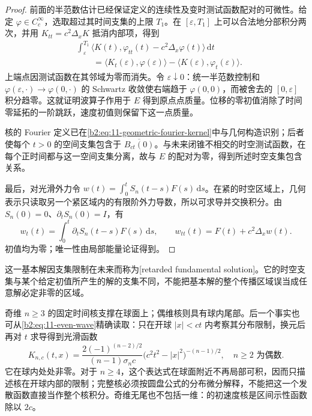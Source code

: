 \begin{proof}
前面的半范数估计已经保证定义的连续性及变时测试函数配对的可微性。给定 \(\varphi\in C_c^\infty\)，选取超过其时间支集的上限 \(T_1\)。在 \([\varepsilon,T_1]\) 上可以合法地分部积分两次，并用 \(K_{tt}=c^2\Delta_xK\) 抵消内部项，得到
\[
 \begin{aligned}
 &\int_\varepsilon^{T_1}\langle K(t),
                  \varphi_{tt}(t)-c^2\Delta_x\varphi(t)\rangle\,\mathrm{d}t\\
 &\qquad=\langle K_t(\varepsilon),\varphi(\varepsilon)\rangle
          -\langle K(\varepsilon),\varphi_t(\varepsilon)\rangle.
 \end{aligned}
\]
上端点因测试函数在其邻域为零而消失。令 \(\varepsilon\downarrow0\)：统一半范数控制和 \(\varphi(\varepsilon,\cdot)\to\varphi(0,\cdot)\) 的 Schwartz 收敛使右端趋于 \(\varphi(0,0)\)，而被舍去的 \([0,\varepsilon]\) 积分趋零。这就证明波算子作用于 \(E\) 得到原点点质量。位移的零初值消除了时间零延拓的一阶跳跃，速度初值则保留下这一点质量。

核的 Fourier 定义已在\eqref{b2:eq:11-geometric-fourier-kernel}中与几何构造识别；后者使每个 \(t>0\) 的空间支集包含于 \(\overline{B_{ct}(0)}\)。与未来闭锥不相交的时空测试函数，在每个正时间都与这一空间支集分离，故与 \(E\) 的配对为零，得到所述时空支集包含关系。

最后，对光滑外力令 \(w(t)=\int_0^tS_n(t-s)F(s)\,\mathrm{d}s\)。在紧的时空区域上，几何表示只读取另一个紧区域内的有限阶外力导数，所以可求导并交换积分。由 \(S_n(0)=0\)、\(\partial_tS_n(0)=I\)，有
\[
 w_t(t)=\int_0^t\partial_tS_n(t-s)F(s)\,\mathrm{d}s,\qquad
 w_{tt}(t)=F(t)+c^2\Delta_xw(t).
\]
初值均为零；唯一性由局部能量论证得到。
\end{proof}

这一基本解因支集限制在未来而称为[retarded fundamental solution]。它的时空支集与某个给定初值所产生的解的支集不同，不能把基本解的整个传播区域误当成任意解必定非零的区域。

\ProseParagraphBreak

奇维 \(n\geq3\) 的固定时间核支撑在球面上；偶维核则具有球内尾部。后一个事实也可从\eqref{b2:eq:11-even-wave}精确读取：只在开球 \(|x|<ct\) 内考察其分布限制，换元后再对 \(t\) 求导得到光滑函数
\[
 K_{n,c}(t,x)=\dfrac{2(-1)^{(n-2)/2}}{(n-1)\sigma_n c}
 \bigl(c^2t^2-|x|^2\bigr)^{-(n-1)/2},\quad n\geq2\text{ 为偶数}.
\]
它在球内处处非零。对于 \(n\geq4\)，这个表达式在球面附近不再局部可积，因而只描述核在开球内部的限制；完整核必须按圆盘公式的分布微分解释，不能把这一个发散函数直接当作整个核积分。奇维无尾也不包括一维：的初速度核是区间示性函数除以 \(2c\)。

